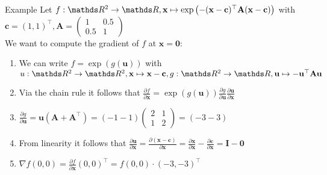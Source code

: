 \documentclass[11pt,compress,t,notes=noshow, xcolor=table]{beamer}
\begin{document}
\begin{vbframe}{Example}
Let  $f:\R^2 \rightarrow \R, \mathbf{x} \mapsto \exp\left(-(\mathbf{x} - \mathbf{c})^\top \mathbf{A} (\mathbf{x} - \mathbf{c})\right)$ with $\mathbf{c} = (1, 1)^\top, \mathbf{A} = \begin{pmatrix}1 & 0.5 \\ 0.5 & 1\end{pmatrix}$\\
We want to compute the gradient of $f$ at $\mathbf{x} = \mathbf{0}:$\\
\medskip
\begin{enumerate}
    \item We can write $f = \exp(g(\mathbf{u}))$ with $u:\R^2\rightarrow\R^2, \mathbf{x}\mapsto \mathbf{x} - \mathbf{c}, g:\R^2\rightarrow\R, \mathbf{u} \mapsto -\mathbf{u}^\top\mathbf{A}\mathbf{u}$
    \item Via the chain rule it follows that $\frac{\partial f}{\partial{\mathbf{x}}} = \exp(g(\mathbf{u}))\frac{\partial g}{\partial\mathbf{u}}\frac{\partial\mathbf{u}}{\partial\mathbf{x}}$
    \item $\frac{\partial g}{\partial\mathbf{u}} = \mathbf{u}(\mathbf{A} + \mathbf{A}^\top) = (-1 -1)\begin{pmatrix}2 & 1 \\ 1 & 2\end{pmatrix} = (-3 -3)$
    \item From linearity it follows that $\frac{\partial\mathbf{u}}{\partial\mathbf{x}} = \frac{\partial(\mathbf{x} - \mathbf{c})}{\partial\mathbf{x}} = \frac{\partial\mathbf{x}}{\partial\mathbf{x}} - \frac{\partial\mathbf{c}}{\partial\mathbf{x}} = \mathbf{I} - \mathbf{0}$
    \item $\nabla f (0, 0) = \frac{\partial f}{\partial{\mathbf{x}}}(0, 0)^\top = f(0,0) \cdot (-3, -3)^\top$
\end{enumerate}

\end{vbframe}

\endlecture
\end{document}
